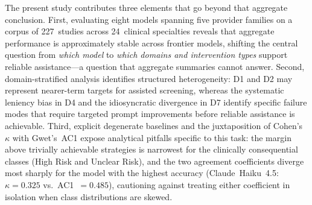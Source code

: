 \documentclass[../main.tex]{subfiles}
\begin{document}
The present study contributes three elements that go beyond that aggregate
conclusion.
First, evaluating eight models spanning five provider families on a corpus of
227~studies across 24~clinical specialties reveals that aggregate performance
is approximately stable across frontier models, shifting the central question
from \emph{which model} to \emph{which domains and intervention types} support
reliable assistance---a question that aggregate summaries cannot answer.
Second, domain-stratified analysis identifies structured heterogeneity: D1
and D2 may represent nearer-term targets for assisted screening, whereas the
systematic leniency bias in D4 and the idiosyncratic divergence in D7 identify
specific failure modes that require targeted prompt improvements before reliable
assistance is achievable.
Third, explicit degenerate baselines and the juxtaposition of Cohen's~$\kappa$
with Gwet's~AC1 expose analytical pitfalls specific to this task: the margin
above trivially achievable strategies is narrowest for the clinically
consequential classes (High Risk and Unclear Risk), and the two agreement
coefficients diverge most sharply for the model with the highest accuracy
(Claude~Haiku~4.5: $\kappa = 0.325$ vs.\ AC1~$= 0.485$), cautioning against
treating either coefficient in isolation when class distributions are skewed.
\end{document}
